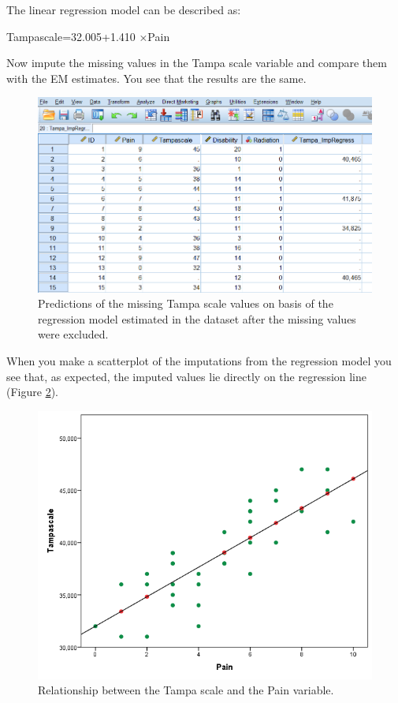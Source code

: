 \documentclass[]{book}
\theoremstyle{definition}
\theoremstyle{definition}
\theoremstyle{definition}
\theoremstyle{remark}
\begin{document}
The linear regression model can be described as:

Tampascale=32.005+1.410 ×Pain

Now impute the missing values in the Tampa scale variable and compare
them with the EM estimates. You see that the results are the same.

\begin{figure}

{\centering \includegraphics[width=0.9\linewidth]{images/fig3.15} 

}

\caption{Predictions of the missing Tampa scale values on basis of the regression model estimated in the dataset after the missing values were excluded.}\label{fig:fig3-15}
\end{figure}

When you make a scatterplot of the imputations from the regression model
you see that, as expected, the imputed values lie directly on the
regression line (Figure \ref{fig:fig3-16}).

\begin{figure}

{\centering \includegraphics[width=0.9\linewidth]{images/fig3.16} 

}

\caption{Relationship between the Tampa scale and the Pain variable.}\label{fig:fig3-16}
\end{figure}
\end{document}

